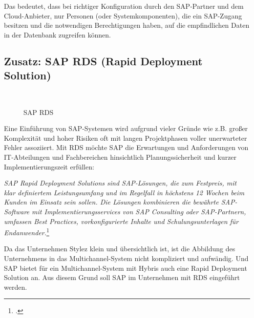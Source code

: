 Das bedeutet, dass bei richtiger Konfiguration durch den SAP-Partner und dem Cloud-Anbieter, nur Personen (oder Systemkomponenten), die ein SAP-Zugang besitzen und die notwendigen Berechtigungen haben, auf die empfindlichen Daten in der Datenbank zugreifen können. 

\subsection{Zusatz: SAP RDS (Rapid Deployment Solution)}
\label{sec:RDS}
\begin{figure}[H]
\centering
\begin{minipage}[t]{1\textwidth}
{\centering{}\\}
\caption{SAP RDS} %
\end{minipage}
\end{figure}
Eine Einführung von SAP-Systemen wird aufgrund vieler Gründe wie z.B. großer Komplexität und hoher Risiken oft mit langen Projektphasen voller unerwarteter Fehler assoziiert. 
Mit RDS möchte SAP die Erwartungen und Anforderungen von IT-Abteilungen und Fachbereichen hinsichtlich Planungssicherheit und kurzer Implementierungszeit erfüllen:

\textit{\glqq SAP Rapid Deployment Solutions sind SAP-Lösungen, die zum Festpreis, mit klar definiertem Leistungsumfang und im Regelfall in höchstens 12 Wochen beim Kunden im Einsatz sein sollen. Die Lösungen kombinieren die bewährte SAP-Software mit Implementierungsservices von SAP Consulting oder SAP-Partnern, umfassen Best Practices, vorkonfigurierte Inhalte und Schulungsunterlagen für Endanwender.\grqq}\footcite[Online im Internet.]{RDS}

Da das Unternehmen Stylez klein und übersichtlich ist, ist die Abbildung des Unternehmens in das Multichannel-System nicht kompliziert und aufwändig. Und SAP bietet für ein Multichannel-System mit Hybris auch eine Rapid Deployment Solution an. Aus diesem Grund soll SAP im Unternehmen mit RDS eingeführt werden.

